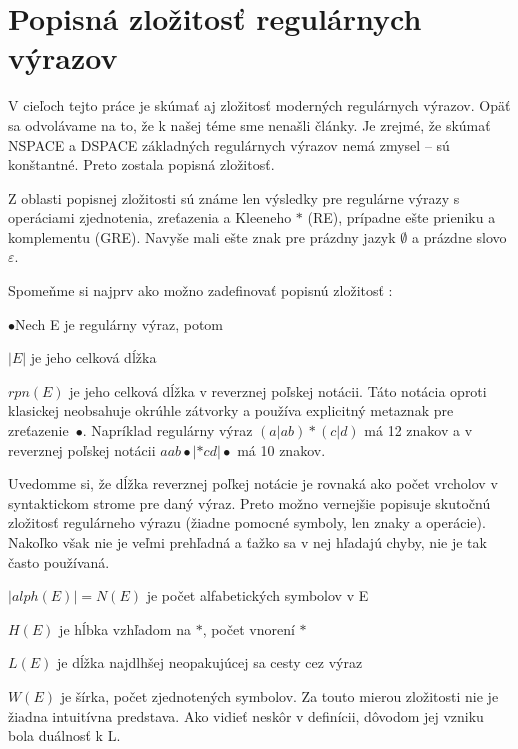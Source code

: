 \section[Popisná zložitosť]{Popisná zložitosť regulárnych výrazov}
\label{uzlozitost}

V cieľoch tejto práce je skúmať aj zložitosť moderných regulárnych výrazov. Opäť sa odvolávame na to, že k našej téme sme nenašli články. Je zrejmé, že skúmať NSPACE a DSPACE základných regulárnych výrazov nemá zmysel -- sú konštantné. Preto zostala popisná zložitosť.

Z oblasti popisnej zložitosti sú známe len výsledky pre regulárne výrazy s operáciami zjednotenia, zreťazenia a Kleeneho $*$ (RE), prípadne ešte prieniku a komplementu (GRE). Navyše mali ešte znak pre prázdny jazyk $\emptyset$ a prázdne slovo $\varepsilon$.

Spomeňme si najprv ako možno zadefinovať popisnú zložitosť \cite{newResults} \cite{compMeasures75}:

\begin{list}{$\bullet$}{Nech E je regulárny výraz, potom}
\item $|E|$ je jeho celková dĺžka
\item $rpn(E)$ je jeho celková dĺžka v reverznej poľskej notácii. Táto notácia oproti klasickej neobsahuje okrúhle zátvorky a používa explicitný metaznak pre zreťazenie~$\bullet$. Napríklad regulárny výraz $(a|ab)*(c|d)$ má 12 znakov a v reverznej poľskej notácii $aab\bullet |*cd|\bullet$ má 10 znakov.

Uvedomme si, že dĺžka reverznej poľkej notácie je rovnaká ako počet vrcholov v syntaktickom strome pre daný výraz. Preto možno vernejšie popisuje skutočnú zložitosť regulárneho výrazu (žiadne pomocné symboly, len znaky a operácie). Nakoľko však nie je veľmi prehľadná a ťažko sa v nej hľadajú chyby, nie je tak často používaná.
\item $|alph(E)|= N(E)$ je počet alfabetických symbolov v E
\item $H(E)$ je hĺbka vzhľadom na $*$, počet vnorení $*$
\item $L(E)$ je dĺžka najdlhšej neopakujúcej sa cesty cez výraz
\item $W(E)$ je šírka, počet zjednotených symbolov. Za touto mierou zložitosti nie je žiadna intuitívna predstava. Ako vidieť neskôr v definícii, dôvodom jej vzniku bola duálnosť k L.
\end{list}

